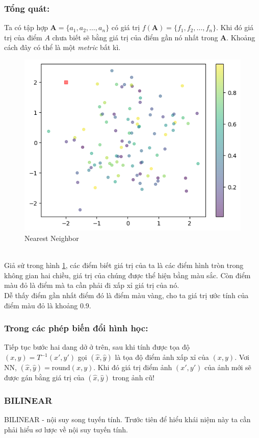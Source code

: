 \documentclass{article}
\begin{document}
\subsubsection*{Tổng quát:} Ta có tập hợp $\textbf{A} = \{a_1, a_2, \ldots, a_n\}$ có giá trị $f(\textbf{A}) = \{f_1, f_2, \ldots, f_n\}$. Khi đó giá trị của điểm $A$ chưa biết sẽ bằng giá trị của điểm gần nó nhất trong \textbf{A}. Khoảng cách đây có thể là một \textit{metric} bất kì.
\begin{figure}[ht!]
\centering
\includegraphics[width = 0.8\linewidth]{fig10.png}
\caption{Nearest Neighbor}
\label{fig10}
\end{figure}
\phantom{a}\\
Giả sử trong hình \ref{fig10}, các điểm biết giá trị của ta là các điểm hình tròn trong không gian hai chiều, giá trị của chúng được thể hiện bằng màu sắc. Còn điểm màu đỏ là điểm mà ta cần phải đi xấp xỉ giá trị của nó.\\
Dễ thấy điểm gần nhất điểm đó là điểm màu vàng, cho ta giá trị ước tính của điểm màu đỏ là khoảng 0.9.
\subsubsection*{Trong các phép biến đổi hình học:}
Tiếp tục bước hai dang dở ở trên, sau khi tính được tọa độ $(x,y) = T^{-1}(x',y')$ gọi $(\hat{x}, \hat{y})$ là tọa độ điểm ảnh xấp xỉ của $(x, y)$. Vơi NN, $(\hat{x},\hat{y}) = \text{round}(x,y)$. Khi đó giá trị điểm ảnh $(x',y')$ của ảnh mới sẽ được gán bằng giá trị của $(\hat{x}, \hat{y})$ trong ảnh cũ!

\subsubsection{BILINEAR}
BILINEAR - nội suy song tuyến tính. Trước tiên để hiểu khái niệm này ta cần phải hiểu sơ lược về nội suy tuyến tính.
\end{document}
